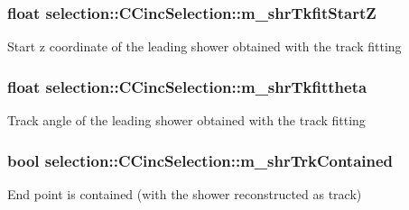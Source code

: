 \subsubsection[{\texorpdfstring{m\+\_\+shr\+Tkfit\+StartZ}{m_shrTkfitStartZ}}]{\setlength{\rightskip}{0pt plus 5cm}float selection\+::\+C\+Cinc\+Selection\+::m\+\_\+shr\+Tkfit\+StartZ\hspace{0.3cm}{\ttfamily [private]}}\hypertarget{classselection_1_1CCincSelection_a9c1c8138a2febe952478d15845ca8846}{}\label{classselection_1_1CCincSelection_a9c1c8138a2febe952478d15845ca8846}
Start z coordinate of the leading shower obtained with the track fitting 
\subsubsection[{\texorpdfstring{m\+\_\+shr\+Tkfittheta}{m_shrTkfittheta}}]{\setlength{\rightskip}{0pt plus 5cm}float selection\+::\+C\+Cinc\+Selection\+::m\+\_\+shr\+Tkfittheta\hspace{0.3cm}{\ttfamily [private]}}\hypertarget{classselection_1_1CCincSelection_a9fa1d825a900a4081323091daa9b0aa7}{}\label{classselection_1_1CCincSelection_a9fa1d825a900a4081323091daa9b0aa7}
Track angle of the leading shower obtained with the track fitting 
\subsubsection[{\texorpdfstring{m\+\_\+shr\+Trk\+Contained}{m_shrTrkContained}}]{\setlength{\rightskip}{0pt plus 5cm}bool selection\+::\+C\+Cinc\+Selection\+::m\+\_\+shr\+Trk\+Contained\hspace{0.3cm}{\ttfamily [private]}}\hypertarget{classselection_1_1CCincSelection_a5cde5d5c0d798594d11f082dadaf52bc}{}\label{classselection_1_1CCincSelection_a5cde5d5c0d798594d11f082dadaf52bc}
End point is contained (with the shower reconstructed as track) 
